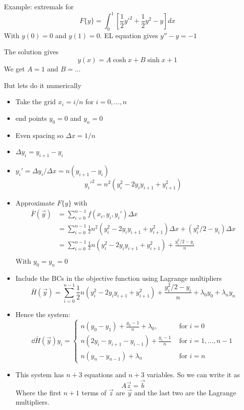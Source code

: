 \documentclass{X:/Documents/Coding/Latex/myassignment}
\begin{document}
Example: extremals for
\[F\{y\} = \int_0^1 \left[\frac12 y'^2 + \frac12 y^2 - y\right] dx\]
With $y(0) = 0$ and $y(1) = 0$.
EL equation gives $y'' - y =-1$

The solution gives
\[y(x) = A\cosh x + B \sinh x +1\]
We get $A = 1$ and $B = \ldots$

But lets do it numerically

\begin{itemize}
	\item Take the grid $x_i = i/n$ for $i=0,\ldots,n$
	\item end points $y_0 = 0$ and $y_n =0$
	\item Even spacing so $\Delta x = 1/n$
	\item $\Delta y_i = y_{i+1} - y_i$
	\item $y_i' = \Delta y_i / \Delta x = n(y_{i+1} - y_i)$
	\[y_i'^2 = n^2 (y_i^2 - 2y_i y_{i+1} + y_{i+1}^2)\]
	\item Approximate $F\{y\}$ with
	\begin{align*}
		\bar{F}(\vec y) &= \sum_{i=0}^{n-1} f(x_i,y_i,y_i') \Delta x\\
		&= \sum_{i=0}^{n-1} \frac12 n^2 (y_i^2 - 2y_i y_{i+1} + y_{i+1}^2) \Delta x + (y_i^2/2 - y_i) \Delta x\\
		&= \sum_{i=0}^{n-1} \frac12 n (y_i^2 - 2y_i y_{i+1} + y_{i+1}^2)  + \frac{y_i^2/2 - y_i}{n} \\
	\end{align*}
	With $y_0 = y_n =0$
	\item Include the BCs in the objective function using Lagrange multipliers
	\[\bar{H}(\vec y) = \sum_{i=0}^{n-1} \frac12 n (y_i^2 - 2y_i y_{i+1} + y_{i+1}^2)  + \frac{y_i^2/2 - y_i}{n}  + \lambda_0 y_0 + \lambda_n y_n\]

	\item Hence the system:
	\[\dd{\bar{H}(\vec y)}{y_i} = \begin{cases}
		n(y_0-y_1) + \frac{y_0-1}{n} + \lambda_0, &\text{ for }i=0\\
		n (2y_i - y_{i+1} - y_{i-1})  + \frac{y_i - 1}{n} &\text{ for }i=1,\ldots,n-1\\
		n(y_n-y_{n-1}) +\lambda_n &\text{ for } i=n
	\end{cases}\]
	\item This system has $n+3$ equations and $n+3$ variables.
	So we can write it as
	\[A\vec z = \vec b\]
	Where the first $n+1$ terms of $\vec z$ are $\vec y$ and the last two are the Lagrange multipliers.
\end{itemize}
\end{document}
